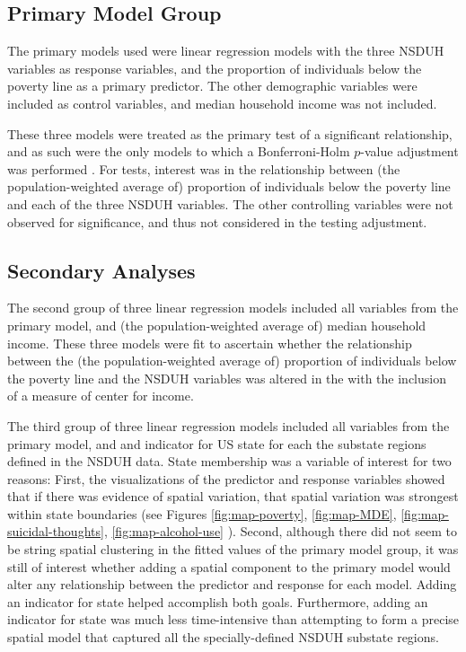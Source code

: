 \documentclass{article}
\begin{document}
\subsection{Primary Model Group}

The primary models used were linear regression models with the three NSDUH
variables as response variables, and
the proportion of individuals below the poverty line as a primary predictor.
The other demographic variables were included as control variables,
and median household income was not included.

These three models were treated as the primary test
of a significant relationship,
and as such were the only models to which a Bonferroni-Holm
$p$-value adjustment was performed \cite{holm}.
For tests, interest was in the relationship between
(the population-weighted average of)
proportion of individuals below the poverty line
and each of the three NSDUH variables.
The other controlling variables were not
observed for significance,
and thus not considered in the testing adjustment.


\subsection{Secondary Analyses}

The second group of three linear regression models included all variables
from the primary model,
and
(the population-weighted average of)
median household income.
These three models were fit to ascertain whether
the relationship between the
(the population-weighted average of)
proportion of individuals below the poverty line
and the NSDUH variables was altered in the
with the inclusion of a measure of center for income.

The third group of three linear regression models included all variables
from the primary model,
and and indicator for US state for each the
substate regions defined in the NSDUH data.
State membership was a variable of interest for two
reasons:
First, the visualizations of the predictor and response variables
showed that if there was evidence of spatial variation,
that spatial variation was strongest within state boundaries
(see Figures
\ref{fig:map-poverty},
\ref{fig:map-MDE},
\ref{fig:map-suicidal-thoughts},
\ref{fig:map-alcohol-use}
).
Second, although there did not seem to be string spatial
clustering in the fitted values of the primary model group,
it was still of interest whether adding a spatial component to
the primary model would alter any relationship between
the predictor and response for each model.
Adding an indicator for state helped accomplish both goals.
Furthermore, adding an indicator for state was much less
time-intensive than attempting to form a precise spatial model
that captured all the specially-defined NSDUH substate regions.
\end{document}
